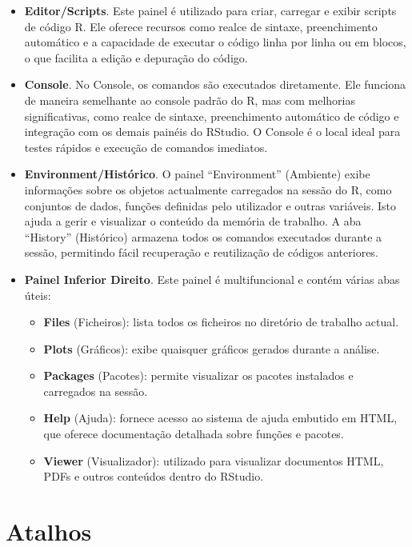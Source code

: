\documentclass[
]{book}
\providecommand{\tightlist}{%
  \setlength{\itemsep}{0pt}\setlength{\parskip}{0pt}}
\begin{document}
\begin{itemize}
\item
  \textbf{Editor/Scripts}. Este painel é utilizado para criar, carregar e
  exibir scripts de código R. Ele oferece recursos como realce de
  sintaxe, preenchimento automático e a capacidade de executar o
  código linha por linha ou em blocos, o que facilita a edição e
  depuração do código.
\item
  \textbf{Console}. No Console, os comandos são executados diretamente. Ele
  funciona de maneira semelhante ao console padrão do R, mas com
  melhorias significativas, como realce de sintaxe, preenchimento
  automático de código e integração com os demais painéis do RStudio.
  O Console é o local ideal para testes rápidos e execução de comandos
  imediatos.
\item
  \textbf{Environment/Histórico}. O painel ``Environment'' (Ambiente) exibe
  informações sobre os objetos actualmente carregados na sessão do R,
  como conjuntos de dados, funções definidas pelo utilizador e outras
  variáveis. Isto ajuda a gerir e visualizar o conteúdo da memória de
  trabalho. A aba ``History'' (Histórico) armazena todos os comandos
  executados durante a sessão, permitindo fácil recuperação e
  reutilização de códigos anteriores.
\item
  \textbf{Painel Inferior Direito}. Este painel é multifuncional e contém
  várias abas úteis:

  \begin{itemize}
  \tightlist
  \item
    \textbf{Files} (Ficheiros): lista todos os ficheiros no diretório de
    trabalho actual.
  \item
    \textbf{Plots} (Gráficos): exibe quaisquer gráficos gerados durante a
    análise.
  \item
    \textbf{Packages} (Pacotes): permite visualizar os pacotes instalados
    e carregados na sessão.
  \item
    \textbf{Help} (Ajuda): fornece acesso ao sistema de ajuda embutido em
    HTML, que oferece documentação detalhada sobre funções e
    pacotes.
  \item
    \textbf{Viewer} (Visualizador): utilizado para visualizar documentos
    HTML, PDFs e outros conteúdos dentro do RStudio.
  \end{itemize}
\end{itemize}

\section{Atalhos}\label{atalhos}
\end{document}
